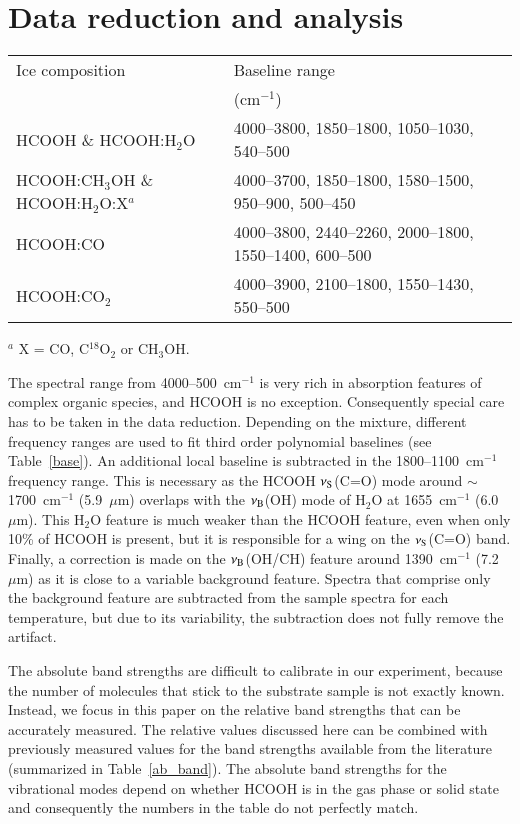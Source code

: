 \documentclass{aa}
\begin{document}
\section{Data reduction and analysis}\label{analysis}

\begin{table*}
\caption{Frequency ranges used for baseline subtraction.}\label{base}
\begin{center}
\begin{tabular}{ll}
\hline
\hline
Ice composition & Baseline range \\
 & (cm$^{-1}$) \\
\hline
HCOOH \& HCOOH:H$_2$O   & 4000--3800, 1850--1800, 1050--1030, 540--500\\
HCOOH:CH$_3$OH \& HCOOH:H$_2$O:X$^a$ & 4000--3700, 1850--1800, 1580--1500, 950--900, 500--450 \\
HCOOH:CO                  & 4000--3800, 2440--2260, 2000--1800, 1550--1400, 600--500 \\
HCOOH:CO$_2$              & 4000--3900, 2100--1800, 1550--1430, 550--500 \\
\hline
\end{tabular}
\end{center}
$^a$ X = CO, C$^{18}$O$_2$ or CH$_3$OH.
\end{table*}

The spectral range from 4000--500~cm$^{-1}$ is very rich in absorption
features of complex organic species, and HCOOH is no
exception. Consequently special care has to be taken in the data
reduction. Depending on the mixture, different frequency ranges are
used to fit third order polynomial baselines (see
Table~\ref{base}). An additional local baseline is subtracted in the
1800--1100~cm$^{-1}$ frequency range. This is necessary as the HCOOH
$\nu_{\rm S}$(C=O) mode around $\sim$1700~cm$^{-1}$ (5.9~$\mu$m)
overlaps with the $\nu_{\rm B}$(OH) mode of H$_2$O at 1655~cm$^{-1}$
(6.0~$\mu$m). This H$_2$O feature is much weaker than the HCOOH
feature, even when only 10\% of HCOOH is present, but it is
responsible for a wing on the $\nu_{\rm S}$(C=O) band. Finally, a
correction is made on the $\nu_{\rm B}$(OH/CH) feature around
1390~cm$^{-1}$ (7.2~$\mu$m) as it is close to a variable background
feature. Spectra that comprise only the background feature are
subtracted from the sample spectra for each temperature, but due to
its variability, the subtraction does not fully remove the artifact.

The absolute band strengths are difficult to calibrate in our
experiment, because the number of molecules that stick to the
substrate sample is not exactly known. Instead, we focus in this paper
on the relative band strengths that can be accurately measured. The
relative values discussed here can be combined with previously
measured values for the band strengths available from the literature
(summarized in Table~\ref{ab_band}). The absolute band strengths for
the vibrational modes depend on whether HCOOH is in the gas phase or
solid state and consequently the numbers in the table do not perfectly
match.
\end{document}
